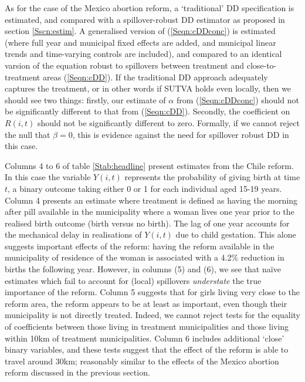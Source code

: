 As for the case of the Mexico abortion reform, a `traditional' DD specification
is estimated, and compared with a spillover-robust DD estimator as proposed in
section \ref{Sscn:estim}.  A generalised version of (\ref{Seqn:cDDconc}) is 
estimated (where full year and municipal fixed effects are added, and municipal 
linear trends and time-varying controls are included), and compared to an 
identical varsion of the equation robust to spillovers between treatment and 
close-to-treatment areas (\ref{Seqn:cDD}).  If the traditional DD approach 
adequately captures the treatment, or in other words if SUTVA holds even locally,
then we should see two things: firstly, our estimate of $\alpha$ from 
(\ref{Seqn:cDDconc}) should not be significantly different to that from 
(\ref{Seqn:cDD}). Secondly, the coefficient on $R(i,t)$ should not be 
significantly different to zero.  Formally, if we cannot reject the null that 
$\beta=0$, this is evidence against the need for spillover robust DD in this 
case.

Columns 4 to 6 of table \ref{Stab:headline} present estimates from the Chile
reform.  In this case the variable $Y(i,t)$ represents the probability of giving
birth at time $t$, a binary outcome taking either 0 or 1 for each individual aged 
15-19 years. Column 4 presents an estimate where treatment is defined as having
the morning after pill available in the municipality where a woman lives one
year prior to the realised birth outcome (birth versus no birth).  The lag of
one year accounts for the mechanical delay in realisations of $Y(i,t)$ due to 
child gestation.  This alone suggests important effects of the reform: having the
reform available in the municipality of residence of the woman is associated with
a 4.2\% reduction in births the following year.  However, in columns (5) and (6),
we see that na\"ive estimates which fail to account for (local) spillovers 
\emph{understate} the true importance of the reform.  Column 5 suggests that
for girls living very close to the reform area, the reform appears to be at least
as important, even though their municipality is not directly treated.  Indeed,
we cannot reject tests for the equality of coefficients between those living
in treatment municipalities and those living within 10km of treatment 
municipalities.  Column 6 includes additional `close' binary variables, and
these tests suggest that the effect of the reform is able to travel around 30km;
reasonably similar to the effects of the Mexico abortion reform discussed in 
the previous section.

